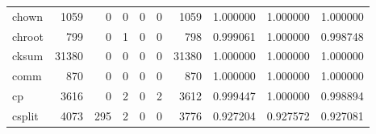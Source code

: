 \begin{tabular}{lrrrrrrrrr}
chown     &                                               1059 &                                                  0 &                                                  0 &                                                  0 &                                                  0 &                                               1059 &                                           1.000000 &                               1.000000 &                             1.000000 \\
chroot    &                                                799 &                                                  0 &                                                  1 &                                                  0 &                                                  0 &                                                798 &                                           0.999061 &                               1.000000 &                             0.998748 \\
cksum     &                                              31380 &                                                  0 &                                                  0 &                                                  0 &                                                  0 &                                              31380 &                                           1.000000 &                               1.000000 &                             1.000000 \\
comm      &                                                870 &                                                  0 &                                                  0 &                                                  0 &                                                  0 &                                                870 &                                           1.000000 &                               1.000000 &                             1.000000 \\
cp        &                                               3616 &                                                  0 &                                                  2 &                                                  0 &                                                  2 &                                               3612 &                                           0.999447 &                               1.000000 &                             0.998894 \\
csplit    &                                               4073 &                                                295 &                                                  2 &                                                  0 &                                                  0 &                                               3776 &                                           0.927204 &                               0.927572 &                             0.927081 \\

\end{tabular}
